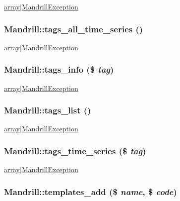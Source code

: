 \hyperlink{}{array$|$MandrillException }\hypertarget{classMandrill_a55ccf7721734dba3f5058206e0b6a4c9}{
\subsubsection[{tags\_\-all\_\-time\_\-series}]{\setlength{\rightskip}{0pt plus 5cm}Mandrill::tags\_\-all\_\-time\_\-series ()}}
\label{classMandrill_a55ccf7721734dba3f5058206e0b6a4c9}
\hyperlink{}{array$|$MandrillException }\hypertarget{classMandrill_a54d848f3ce34a1b0b12cbc78cfc2c2fa}{
\subsubsection[{tags\_\-info}]{\setlength{\rightskip}{0pt plus 5cm}Mandrill::tags\_\-info (\$ {\em tag})}}
\label{classMandrill_a54d848f3ce34a1b0b12cbc78cfc2c2fa}
\hyperlink{}{array$|$MandrillException }\hypertarget{classMandrill_a10ffe6d8e7c50cdc2fdedc8071d39ddd}{
\subsubsection[{tags\_\-list}]{\setlength{\rightskip}{0pt plus 5cm}Mandrill::tags\_\-list ()}}
\label{classMandrill_a10ffe6d8e7c50cdc2fdedc8071d39ddd}
\hyperlink{}{array$|$MandrillException }\hypertarget{classMandrill_a541129f0740d60f5545db989367b14f0}{
\subsubsection[{tags\_\-time\_\-series}]{\setlength{\rightskip}{0pt plus 5cm}Mandrill::tags\_\-time\_\-series (\$ {\em tag})}}
\label{classMandrill_a541129f0740d60f5545db989367b14f0}
\hyperlink{}{array$|$MandrillException }\hypertarget{classMandrill_ab42ad92f550edc23e11fcdc79c8b8ab6}{
\subsubsection[{templates\_\-add}]{\setlength{\rightskip}{0pt plus 5cm}Mandrill::templates\_\-add (\$ {\em name}, \/  \$ {\em code})}}
